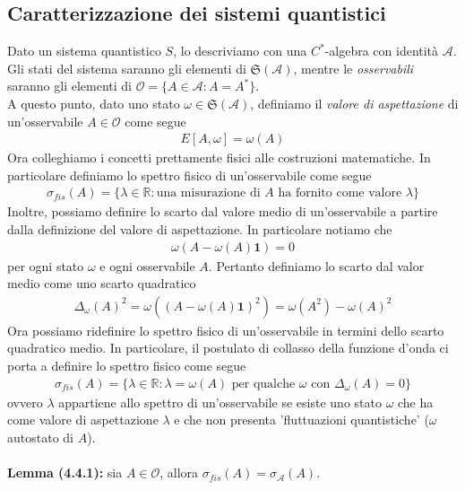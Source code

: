 \documentclass{article}
\numberwithin{equation}{subsection}
\begin{document}
\newpage
\subsection{Caratterizzazione dei sistemi quantistici}
Dato un sistema quantistico $S$, lo descriviamo con una $C^*$-algebra con identità $\mathscr{A}$. Gli stati del sistema saranno gli elementi di $\mathfrak{S}(\mathscr{A})$, mentre le \textit{osservabili} saranno gli elementi di $\mathscr{O} = \{A \in \mathscr{A} : A = A^*\}$. \\
A questo punto, dato uno stato $\omega \in \mathfrak{S}(\mathscr{A})$, definiamo il \textit{valore di aspettazione} di un'osservabile $A \in \mathscr{O}$ come segue
\begin{align*}
    E[A, \omega] = \omega(A)
\end{align*}
Ora colleghiamo i concetti prettamente fisici alle costruzioni matematiche. In particolare definiamo lo spettro fisico di un'osservabile come segue
\begin{align*}
    \sigma_{fis}(A) = \{\lambda \in \mathbb{R} : \text{una misurazione di } A \text{ ha fornito come valore } \lambda\}
\end{align*}
Inoltre, possiamo definire lo scarto dal valore medio di un'osservabile a partire dalla definizione del valore di aspettazione. In particolare notiamo che
\begin{align*}
    \omega(A - \omega(A)\mathbf{1}) = 0
\end{align*}
per ogni stato $\omega$ e ogni osservabile $A$. Pertanto definiamo lo scarto dal valor medio come uno scarto quadratico
\begin{align*}
    \Delta_\omega(A)^2 = \omega((A - \omega(A)\mathbf{1})^2) = \omega(A^2) - \omega(A)^2
\end{align*}
Ora possiamo ridefinire lo spettro fisico di un'osservabile in termini dello scarto quadratico medio. In particolare, il postulato di collasso della funzione d'onda ci porta a definire lo spettro fisico come segue
\begin{align*}
    \sigma_{fis}(A) = \{\lambda \in \mathbb{R} : \lambda = \omega(A) \text{ per qualche } \omega \text{ con } \Delta_\omega(A) = 0\}
\end{align*}
ovvero $\lambda$ appartiene allo spettro di un'osservabile se esiste uno stato $\omega$ che ha come valore di aspettazione $\lambda$ e che non presenta 'fluttuazioni quantistiche' ($\omega$ autostato di $A$). \\ \\
\textbf{Lemma (4.4.1):} sia $A \in \mathscr{O}$, allora $\sigma_{fis}(A) = \sigma_\mathscr{A}(A)$. \\
\end{document}
